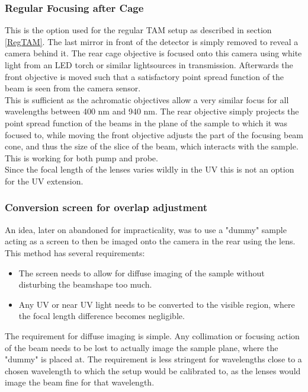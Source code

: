 \documentclass[twoside,openright]{scrreprt}
\begin{document}
\subsubsection{Regular Focusing after Cage}\label{regRearFocus}
This is the option used for the regular TAM setup as described in section \ref{RegTAM}. The last mirror in front of the detector is simply removed to reveal a camera behind it. The rear cage objective is focused onto this camera using white light from an LED torch or similar lightsources in transmission. Afterwards the front objective is moved such that a satisfactory point spread function of the beam is seen from the camera sensor.\\ 
This is sufficient as the achromatic objectives allow a very similar focus for all wavelengths between 400 nm and 940 nm. The rear objective simply projects the point spread function of the beams in the plane of the sample to which it was focused to, while moving the front objective adjusts the part of the focusing beam cone, and thus the size of the slice of the beam, which interacts with the sample. This is working for both pump and probe.\\
Since the focal length of the lenses varies wildly in the UV this is not an option for the UV extension.
\subsubsection{Conversion screen for overlap adjustment}
An idea, later on abandoned for impracticality, was to use a "dummy" sample acting as a screen to then be imaged onto the camera in the rear using the lens. This method has several requirements:
\begin{itemize}
\item The screen needs to allow for diffuse imaging of the sample without disturbing the beamshape too much.
\item Any UV or near UV light needs to be converted to the visible region, where the focal length difference becomes negligible.
\end{itemize}

The requirement for diffuse imaging is simple. Any collimation or focusing action of the beam needs to be lost to actually image the sample plane, where the "dummy" is placed at. The requirement is less stringent for wavelengths close to a chosen wavelength to which the setup would be calibrated to, as the lenses would image the beam fine for that wavelength.\\
\end{document}

